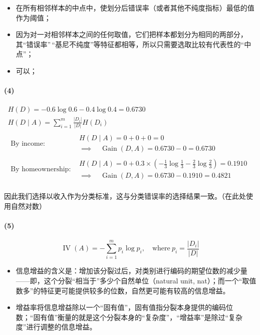 \documentclass{ctexart}
\begin{document}
\begin{itemize}

\item
  在所有相邻样本的中点中，使划分后错误率（或者其他不纯度指标）最低的值作为阈值；
\item
  因为对一对相邻样本之间的任何取值，它们把样本都划分为相同的两部分，其``错误率''\,``基尼不纯度''等特征都相等，所以只需要选取比较有代表性的``中点''；
\item
  可以；
\end{itemize}

\paragraph{(4)}\label{section-9}


\begin{gather*}
H(D) = -0.6\log0.6-0.4\log0.4=0.6730\\
H(D\mid A) = \sum_{i=1}^m\frac{|D_i|}{|D|}H(D_i)\\
\begin{matrix}
\text{By income:} &
\begin{matrix}
H(D\mid A)=0+0+0=0\\
\implies \quad \operatorname{Gain}(D,A)=0.6730-0=0.6730
\end{matrix}\\
\text{By homeownership:} &
\begin{matrix}
H(D\mid A)=0+0.3\times(-\frac{1}{3}\log\frac{1}{3}-\frac{2}{3}\log\frac{2}{3})=0.1910 \\
\implies \quad \operatorname{Gain}(D,A)=0.6730-0.1910=0.4821
\end{matrix}
\end{matrix}
\end{gather*}


因此我们选择以收入作为分类标准，这与分类错误率的选择结果一致。（在此处使用自然对数）

\paragraph{(5)}\label{section-10}

\begin{equation*}
\operatorname{IV}(A)=-\sum_{i=1}^mp_i\log p_i,\quad\text{where}~p_i=\frac{|D_i|}{|D|}
\end{equation*}

\begin{itemize}

\item
  信息增益的含义是：增加该分裂过后，对类别进行编码的期望位数的减少量------即，这个分裂``相当于''多少个自然单位（natural
  unit,
  nat）；而一个``取值数多''的特征更可能提供较多的位数，自然更可能有较高的信息增益。
\item
  增益率将信息增益除以一个``固有值''，固有值指分裂本身提供的编码位数；``固有值''衡量的就是这个分裂本身的``复杂度''，``增益率''是除过``复杂度''进行调整的信息增益。
\end{itemize}
\end{document}
